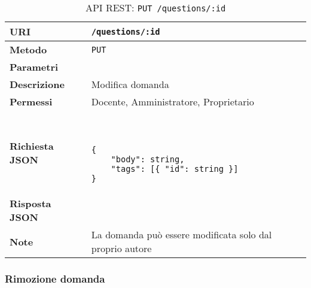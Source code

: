         \begin{table}[H]
            \begin{center}
                \begin{tabular}{p{} p{}}
                    \toprule
                    \textbf{URI} & \texttt{/questions/:id} \\ \midrule
                    \textbf{Metodo} & \texttt{PUT} \\ \midrule
                    \textbf{Parametri} & \\ \midrule
                    \textbf{Descrizione} & Modifica domanda \\ \midrule
                    \textbf{Permessi} & Docente, Amministratore, Proprietario  \\ \midrule
                    \textbf{Richiesta JSON} & \
                        \begin{lstlisting}[basicstyle={\ttfamily}]
{
    "body": string,
    "tags": [{ "id": string }]
}
                        \end{lstlisting}
                        \\ \midrule
                    \textbf{Risposta JSON} & \\ \midrule
                    \textbf{Note} & La domanda può essere modificata solo dal proprio autore \\
                    \bottomrule
                \end{tabular}
                \caption{API REST: \texttt{PUT /questions/:id}}
            \end{center}
        \end{table}

    \subsubsection{Rimozione domanda}

